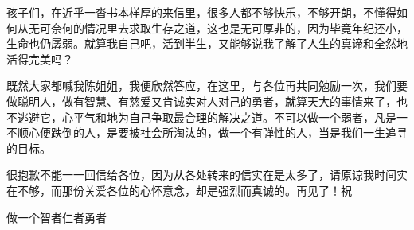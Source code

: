 \par 孩子们，在近乎一沓书本样厚的来信里，很多人都不够快乐，不够开朗，不懂得如何从无可奈何的情况里去求取生存之道，这也是无可厚非的，因为毕竟年纪还小，生命也仍孱弱。就算我自己吧，活到半生，又能够说我了解了人生的真谛和全然地活得完美吗？
\par 既然大家都喊我陈姐姐，我便欣然答应，在这里，与各位再共同勉励一次，我们要做聪明人，做有智慧、有慈爱又肯诚实对人对己的勇者，就算天大的事情来了，也不逃避它，心平气和地为自己争取最合理的解决之道。不可以做一个弱者，凡是一不顺心便跌倒的人，是要被社会所淘汰的，做一个有弹性的人，当是我们一生追寻的目标。
\par 很抱歉不能一一回信给各位，因为从各处转来的信实在是太多了，请原谅我时间实在不够，而那份关爱各位的心怀意念，却是强烈而真诚的。再见了！祝
\par 做一个智者仁者勇者
\par {}
\par {}


